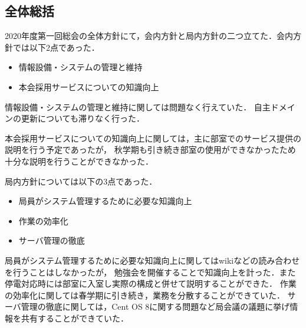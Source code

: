 \subsection*{全体総括}


2020年度第一回総会の全体方針にて，会内方針と局内方針の二つ立てた．会内方針では以下2点であった．
\begin{itemize}
    \item 情報設備・システムの管理と維持
    \item 本会採用サービスについての知識向上
  \end{itemize}

情報設備・システムの管理と維持に関しては問題なく行えていた．
自主ドメインの更新についても滞りなく行った．

本会採用サービスについての知識向上に関しては，主に部室でのサービス提供の説明を行う予定であったが，
秋学期も引き続き部室の使用ができなかったため十分な説明を行うことができなかった．

局内方針については以下の3点であった．
\begin{itemize}
    \item 局員がシステム管理するために必要な知識向上
    \item 作業の効率化
    \item サーバ管理の徹底
\end{itemize}

局員がシステム管理するために必要な知識向上に関してはwikiなどの読み合わせを行うことはしなかったが，
勉強会を開催することで知識向上を計った．また停電対応時には部室に入室し実際の構成と併せて説明することができた．
作業の効率化に関しては春学期に引き続き，業務を分散することができていた．
サーバ管理の徹底に関しては，Cent OS 8に関する問題など局会議の議題に挙げ情報を共有することができていた．